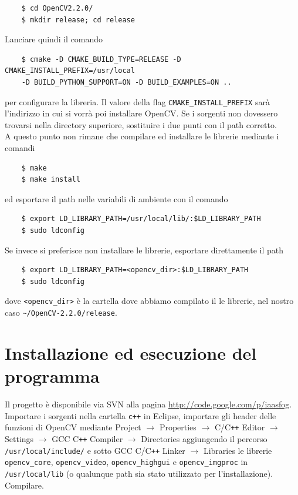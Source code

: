 \documentclass[12pt]{report}
\begin{document}
\begin{verbatim}
	$ cd OpenCV2.2.0/
	$ mkdir release; cd release
\end{verbatim}

\noindent Lanciare quindi il comando

\begin{verbatim}
	$ cmake -D CMAKE_BUILD_TYPE=RELEASE -D CMAKE_INSTALL_PREFIX=/usr/local
	-D BUILD_PYTHON_SUPPORT=ON -D BUILD_EXAMPLES=ON ..
\end{verbatim}

\noindent per configurare la libreria. Il valore della flag \verb|CMAKE_INSTALL_PREFIX| sar\`a l'indirizzo in cui si vorr\`a poi installare OpenCV. Se i sorgenti non dovessero trovarsi nella directory superiore, sostituire i due punti con il path corretto.\\

\noindent A questo punto non rimane che compilare ed installare le librerie mediante i comandi

\begin{verbatim}
	$ make
	$ make install
\end{verbatim}

\noindent ed esportare il path nelle variabili di ambiente con il comando

\begin{verbatim}
	$ export LD_LIBRARY_PATH=/usr/local/lib/:$LD_LIBRARY_PATH
	$ sudo ldconfig
\end{verbatim}

\noindent Se invece si preferisce non installare le librerie, esportare direttamente il path 

\begin{verbatim}
	$ export LD_LIBRARY_PATH=<opencv_dir>:$LD_LIBRARY_PATH
	$ sudo ldconfig
\end{verbatim}

\noindent dove \verb|<opencv_dir>| \`e la cartella dove abbiamo compilato il le librerie, nel nostro caso \verb|~/OpenCV-2.2.0/release|.

\section{Installazione ed esecuzione del programma}
\noindent Il progetto \`e disponibile via SVN alla pagina \url{http://code.google.com/p/iaasfog}.\\
Importare i sorgenti nella cartella \verb|c++| in Eclipse, importare gli header delle funzioni di OpenCV mediante Project $\rightarrow$ Properties  $\rightarrow$ C\slash C\verb|++| Editor $\rightarrow$ Settings $\rightarrow$ GCC C\verb|++| Compiler $\rightarrow$ Directories aggiungendo il percorso \verb|/usr/local/include/| e sotto GCC C\slash C\verb|++| Linker $\rightarrow$ Libraries le librerie \verb|opencv_core|, \verb|opencv_video|, \verb|opencv_highgui| e \verb|opencv_imgproc| in \verb|/usr/local/lib| (o qualunque path sia stato utilizzato per l'installazione).\\
Compilare.\\
\end{document}
